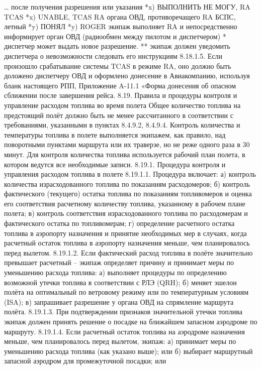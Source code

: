 … после получения разрешения или указания	*x) ВЫПОЛНИТЬ НЕ МОГУ, RA TCAS	*x) UNABLE, TCAS RA
органа ОВД, противоречащего RA БСПС, летный	*y) ПОНЯЛ	*y) ROGER
экипаж выполняет RA и непосредственно		
информирует орган ОВД (радиообмен между		
пилотом и диспетчером)		
* диспетчер может выдать новое разрешение.
** экипаж должен уведомить диспетчера о невозможности следовать его инструкциям
8.18.1.5. Если произошло срабатывание системы TCAS в режиме RA, оно должно быть доложено диспетчеру ОВД и оформлено донесение в Авиакомпанию, используя бланк настоящего РПП, Приложение A-11.1 «Форма донесения об опасном сближении после завершения рейса.
8.19.	Правила и процедуры контроля и управление расходом топлива во время полета
Общее количество топлива на предстоящий полёт должно быть не менее рассчитанного в соответствии с требованиями, указанными в пунктах 8.4.9.2, 8.4.9.4.
Контроль количества и температуры топлива в полете выполняется экипажем, как правило, над поворотными пунктами маршрута или их траверзе, но не реже одного раза в 30 минут. Для контроля количества топлива используется рабочий план полета, в котором ведутся все необходимые записи.
8.19.1.	Процедура контроля и управления расходом топлива в полете 
8.19.1.1. Процедура включает:
а)	контроль количества израсходованного топлива по показаниям расходомеров;
б)	контроль фактического (текущего) остатка топлива по показаниям топливомеров и оценка его соответствия расчетному количеству топлива, указанному в рабочем плане полета;
в)	контроль соответствия израсходованного топлива по расходомерам и фактического остатка по топливомерам;
г)	определение расчетного остатка топлива в аэропорту назначения и принятие необходимых мер в случаях, когда расчетный остаток топлива в аэропорту назначения меньше, чем планировалось перед вылетом.
8.19.1.2. Если фактический расход топлива в полёте значительно превышает расчетный – экипаж определяет причину и принимает меры по уменьшению расхода топлива:
а)	выполняет процедуры по определению возможной утечки топлива в соответствии с РЛЭ (QRH);
б)	меняет эшелон полёта на оптимальный по ветровому режиму или по температурным условиям (ISA);
в)	запрашивает разрешение у органа ОВД на спрямление маршрута полёта.
8.19.1.3. При подтверждении признаков значительной утечки топлива экипаж должен принять решение о посадке на ближайшем запасном аэродроме по маршруту.
8.19.1.4. Если расчетный остаток топлива на аэродроме назначения меньше, чем планировалось перед вылетом, экипаж:
а)	принимает меры по уменьшению расхода топлива (как указано выше); или
б)	выбирает маршрутный запасной аэродром для промежуточной посадки; или

